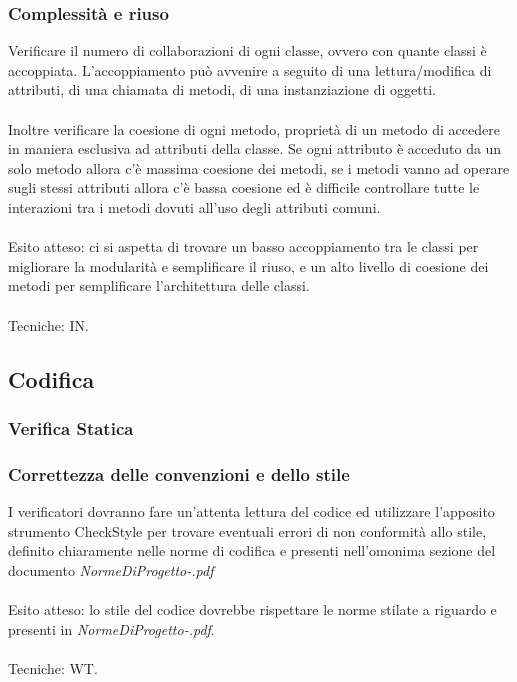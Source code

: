 \subsubsection*{Complessit\`a e riuso}
Verificare il numero di collaborazioni di ogni classe, ovvero con quante classi
\`e accoppiata. L'accoppiamento pu\`o avvenire a seguito di una lettura/modifica
di attributi, di una chiamata di metodi, di una instanziazione di oggetti. \\ \\
Inoltre verificare la coesione di ogni metodo, propriet\`a di un metodo di
accedere in maniera esclusiva ad attributi della classe. Se ogni attributo \`e acceduto da
un solo metodo allora c'\`e massima coesione dei metodi, se i metodi vanno ad
operare sugli stessi attributi allora c'\`e bassa coesione ed \`e difficile
controllare tutte le interazioni tra i metodi dovuti all'uso degli attributi comuni.
\\ \\
Esito atteso: ci si aspetta di trovare un basso accoppiamento tra le classi per
migliorare la modularit\`a e semplificare il riuso, e un alto livello di
coesione dei metodi per semplificare l'architettura delle classi. \\ \\ 
Tecniche: IN.

\subsection{Codifica}

\subsubsection{Verifica Statica}

\subsubsection*{Correttezza delle convenzioni e dello stile}
I verificatori dovranno fare un'attenta lettura del codice ed utilizzare
l'apposito strumento CheckStyle per trovare eventuali errori di non
conformit\`a allo stile, definito chiaramente nelle norme di codifica e
presenti nell'omonima sezione del documento
\emph{NormeDiProgetto-\versionenormeprogetto.pdf}\\\\
Esito atteso: lo stile del codice dovrebbe rispettare le norme stilate a
riguardo e presenti in \emph{NormeDiProgetto-\versionenormeprogetto.pdf}.\\\\ 
Tecniche: WT.

